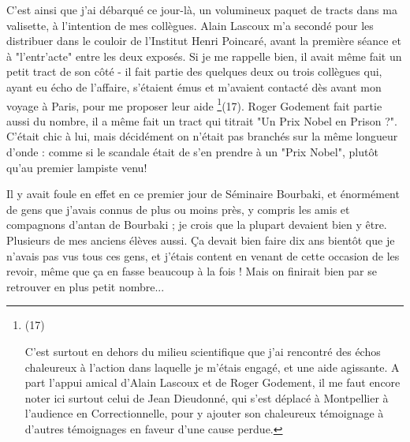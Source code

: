 C'est ainsi que j'ai débarqué ce jour-là, un volumineux paquet de tracts dans ma valisette, à l'intention de mes collègues. Alain Lascoux m'a secondé pour les distribuer dans le couloir de l'Institut Henri Poincaré, avant la première séance et à "l'entr'acte" entre les deux exposés. Si je me rappelle bien, il avait même fait un petit tract de son côté - il fait partie des quelques deux ou trois collègues qui, ayant eu écho de l'affaire, s'étaient émus et m'avaient contacté dès avant mon voyage à Paris, pour me proposer leur aide \footnote{(17)\par C'est surtout en dehors du milieu scientifique que j'ai rencontré des échos chaleureux à l'action dans laquelle je m'étais engagé, et une aide agissante. A part l'appui amical d'Alain Lascoux et de Roger Godement, il me faut encore noter ici surtout celui de Jean Dieudonné, qui s'est déplacé à Montpellier à l'audience en Correctionnelle, pour y ajouter son chaleureux témoignage à d'autres témoignages en faveur d'une cause perdue.}(17). Roger Godement fait partie aussi du nombre, il a même fait un tract qui titrait "Un Prix Nobel en Prison ?". C'était chic à lui, mais décidément on n'était pas branchés sur la même longueur d'onde : comme si le scandale était de s'en prendre à un "Prix Nobel", plutôt qu'au premier lampiste venu!

Il y avait foule en effet en ce premier jour de Séminaire Bourbaki, et énormément de gens que j'avais connus de plus ou moins près, y compris les amis et compagnons d'antan de Bourbaki ; je crois que la plupart devaient bien y être. Plusieurs de mes anciens élèves aussi. Ça devait bien faire dix ans bientôt que je n'avais pas vus tous ces gens, et j'étais content en venant de cette occasion de les revoir, même que ça en fasse beaucoup à la fois ! Mais on finirait bien par se retrouver en plus petit nombre...

